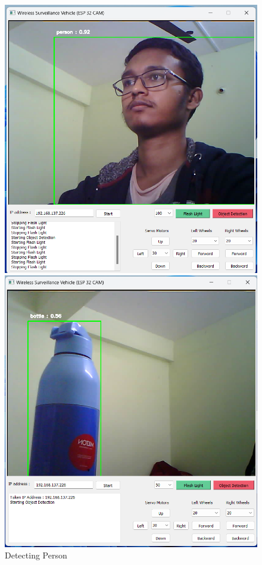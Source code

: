 \documentclass[12pt,a4paper]{report}
\begin{document}
\begin{enumerate}
    \begin{figure}[H]
    \centering
    \begin{minipage}{0.30\textwidth}
        \centering
        \includegraphics[width=\textwidth]{person}  %
        \caption{Detecting Person}
        \label{fig:person}
    \end{minipage} \hfill
    \begin{minipage}{0.30\textwidth}
        \centering
        \includegraphics[width=\textwidth]{bottle}  %

\end{minipage}
\end{figure}
\end{enumerate}
\end{document}
